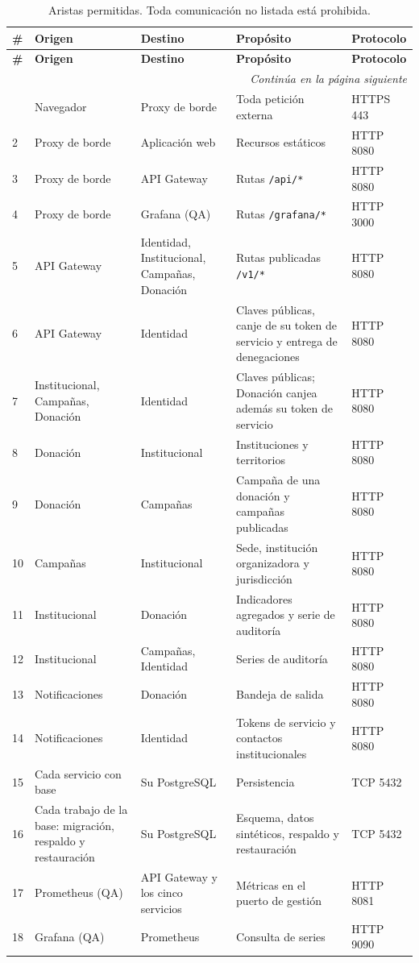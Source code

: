 \documentclass[11pt,a4paper]{article}
\newcommand{\contlinea}[1]{\multicolumn{#1}{r}{\footnotesize\itshape Continúa en la página siguiente}}
\begin{document}
\begin{longtable}{L{0.6cm} L{2.9cm} L{3.3cm} L{5.4cm} L{1.7cm}}
\caption{Aristas permitidas. Toda comunicación no listada está prohibida.}\label{tab:aristas}\\
\toprule
\textbf{\#} & \textbf{Origen} & \textbf{Destino} & \textbf{Propósito} & \textbf{Protocolo} \\
\midrule
\endfirsthead
\toprule
\textbf{\#} & \textbf{Origen} & \textbf{Destino} & \textbf{Propósito} & \textbf{Protocolo} \\
\midrule
\endhead
\midrule
\contlinea{5} \\
\endfoot
\bottomrule
{} & Navegador & Proxy de borde & Toda petición externa & HTTPS 443 \\
2 & Proxy de borde & Aplicación web & Recursos estáticos & HTTP 8080 \\
3 & Proxy de borde & API Gateway & Rutas \texttt{/api/*} & HTTP 8080 \\
4 & Proxy de borde & Grafana (QA) & Rutas \texttt{/grafana/*} & HTTP 3000 \\
5 & API Gateway & Identidad, Institucional, Campañas, Donación & Rutas publicadas \texttt{/v1/*} & HTTP 8080 \\
6 & API Gateway & Identidad & Claves públicas, canje de su token de servicio y entrega de denegaciones & HTTP 8080 \\
7 & Institucional, Campañas, Donación & Identidad & Claves públicas; Donación canjea además su token de servicio & HTTP 8080 \\
8 & Donación & Institucional & Instituciones y territorios & HTTP 8080 \\
9 & Donación & Campañas & Campaña de una donación y campañas publicadas & HTTP 8080 \\
10 & Campañas & Institucional & Sede, institución organizadora y jurisdicción & HTTP 8080 \\
11 & Institucional & Donación & Indicadores agregados y serie de auditoría & HTTP 8080 \\
12 & Institucional & Campañas, Identidad & Series de auditoría & HTTP 8080 \\
13 & Notificaciones & Donación & Bandeja de salida & HTTP 8080 \\
14 & Notificaciones & Identidad & Tokens de servicio y contactos institucionales & HTTP 8080 \\
15 & Cada servicio con base & Su PostgreSQL & Persistencia & TCP 5432 \\
16 & Cada trabajo de la base: migración, respaldo y restauración & Su PostgreSQL & Esquema, datos sintéticos, respaldo y restauración & TCP 5432 \\
17 & Prometheus (QA) & API Gateway y los cinco servicios & Métricas en el puerto de gestión & HTTP 8081 \\
18 & Grafana (QA) & Prometheus & Consulta de series & HTTP 9090 \\
\end{longtable}
\end{document}
